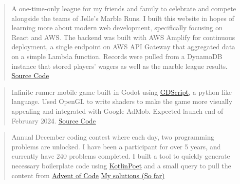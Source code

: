 

\begin{cvparagraph}

\begin{quote}
\thinspace A one-time-only league for my friends and family to celebrate and compete alongside the teams of Jelle's Marble Runs. I built this website in hopes of learning 
more about modern web development, specifically focusing on React and AWS. The backend was built with AWS Amplify for continuous deployment, a single endpoint on AWS API Gateway
that aggregated data on a simple Lambda function. Records were pulled from a DynamoDB instance that stored players' wagers as well as the marble league results.
\newline\href{https://github.com/johnsoe/thg_marbles}{\underline {Source Code}}
\end{quote}

\begin{quote}
\thinspace Infinite runner mobile game built in Godot using \href{https://docs.godotengine.org/en/stable/tutorials/scripting/gdscript/gdscript_basics.html}{\underline{GDScript}}, a python like language.
Used OpenGL to write shaders to make the game more visually appealing and integrated with Google AdMob. Expected launch end of February 2024. 
\newline\href{https://github.com/johnsoe/Track-Four}{\underline {Source Code}}
\end{quote}

\begin{quote}
\thinspace Annual December coding contest where each day, two programming problems are unlocked. I have been a participant for over 5 years, and currently have 240 problems completed.
I built a tool to quickly generate necessary boilerplate code using \href{https://square.github.io/kotlinpoet/}{\underline{KotlinPoet}} and a small query to pull the content from \href{https://adventofcode.com}{\underline{Advent of Code}}
\newline\href{https://github.com/johnsoe/advent_kotlin}{\underline {My solutions (So far)}}
\end{quote}


\end{cvparagraph}
